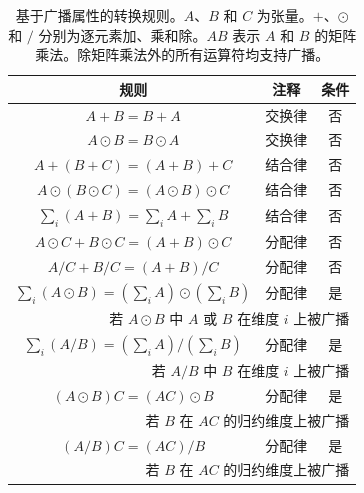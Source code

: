 \begin{table}[h]
    \centering
    \caption{基于广播属性的转换规则。$A$、$B$ 和 $C$ 为张量。$+$、$\odot$ 和 $/$ 分别为逐元素加、乘和除。$AB$ 表示 $A$ 和 $B$ 的矩阵乘法。除矩阵乘法外的所有运算符均支持广播。}
    \begin{tabular}{ccc}
       \toprule
       规则  & 注释 & 条件 \\
       \hline
       $A + B = B + A$  & 交换律 & 否 \\  
       $A \odot B = B \odot A$  & 交换律 & 否 \\  
       
       $A + (B + C) = (A + B) + C$  & 结合律 & 否 \\  
       $A \odot (B \odot C) = (A \odot B) \odot C$  & 结合律 & 否 \\  
       $\sum_i(A + B) = \sum_iA + \sum_iB$ & 结合律 & 否 \\

       $A \odot C + B \odot C = (A + B) \odot C$ & 分配律 & 否 \\
       $A / C + B / C = (A + B) / C$ & 分配律 & 否 \\

        \hline

       $\sum_i(A \odot B) = (\sum_iA) \odot (\sum_iB)$ & 分配律 & 是 \\
       \multicolumn{3}{r}{若 $A \odot B$ 中 $A$ 或 $B$ 在维度 $i$ 上被广播} \\
       
       $\sum_i(A / B) = (\sum_iA) / (\sum_iB)$ & 分配律 & 是 \\
       \multicolumn{3}{r}{若 $A / B$ 中 $B$ 在维度 $i$ 上被广播} \\
       
       $(A \odot B)C = (AC) \odot B$ & 分配律 & 是 \\
       \multicolumn{3}{r}{若 $B$ 在 $AC$ 的归约维度上被广播} \\
       
       $(A / B)C = (AC) / B$ & 分配律 & 是 \\
       \multicolumn{3}{r}{若 $B$ 在 $AC$ 的归约维度上被广播} \\
       \bottomrule
    \end{tabular}
    \label{tab:broadcast_based_transform}
\end{table}

